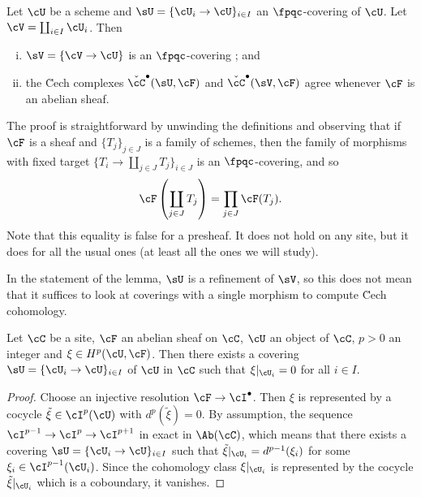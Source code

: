 \begin{lem} \label{lem:CechComplexes}
Let $\cU$ be a scheme and $\sU = \{ \cU_i \to \cU \}_{i \in I}$ an $\fpqc$-covering of $\cU$. Let $\cV = \coprod_{i \in I} \cU_i$. Then
\begin{enumerate}[i.]
\item 
$\sV = \{ \cV \to \cU \}$ is an $\fpqc$-covering ; and
\item
the \u Cech complexes $\check{\cC}^\bullet (\sU, \cF)$ and $\check{\cC}^\bullet (\sV, \cF)$ agree whenever $\cF$ is an abelian sheaf.
\end{enumerate} 
\end{lem}

The proof is straightforward by unwinding the definitions and observing that if $\cF$ is a sheaf and $\{ T_j \}_{j \in J}$ is a family of schemes, then the family of morphisms with fixed target $\{ T_i \to \coprod_{j \in J} T_j \}_{i \in J}$ is an $\fpqc$-covering, and so
$$
\cF \left( \coprod_{j \in J} T_j \right) = \prod_{j \in J} \cF (T_j).
$$
Note that this equality is false for a presheaf. It does not hold on any site, but it does for all the usual ones (at least all the ones we will study).

\begin{remark}
In the statement of the lemma, $\sU$ is a refinement of $\sV$, so this does not mean that it suffices to look at coverings with a single morphism to compute \u Cech cohomology.
\end{remark}

\begin{lem} \label{lem:LocOfCohomology}
Let $\cC$ be a site, $\cF$ an abelian sheaf on $\cC$, $\cU$ an object of $\cC$, $p >0$ an integer and $\xi \in H^p(\cU, \cF)$. Then there exists a covering $\sU = \{ \cU_i \to \cU \}_{i \in I}$ of $\cU$ in $\cC$ such that $\xi |_{\cU_i} = 0$ for all $i \in I$.
\end{lem}

\begin{proof}
Choose an injective resolution $\cF \to \cI^\bullet$. Then $\xi$ is represented by a cocycle $\tilde{\xi} \in \cI^p(\cU)$ with $d^p(\tilde{\xi}) = 0$. By assumption, the sequence $\cI^{p-1} \to \cI^{p} \to \cI^{p+1}$ in exact in $\Ab(\cC)$, which means that there exists a covering $\sU = \{ \cU_i \to \cU \}_{i \in I}$ such that $\tilde{\xi}|_{\cU_i} = d^{p-1}(\xi_i)$ for some $\xi_i \in \cI^{p-1}(\cU_i)$. Since the cohomology class $\xi|_{\cU_i}$ is represented by the cocycle $\tilde{\xi}|_{\cU_i}$ which is a coboundary, it vanishes.
\end{proof}

